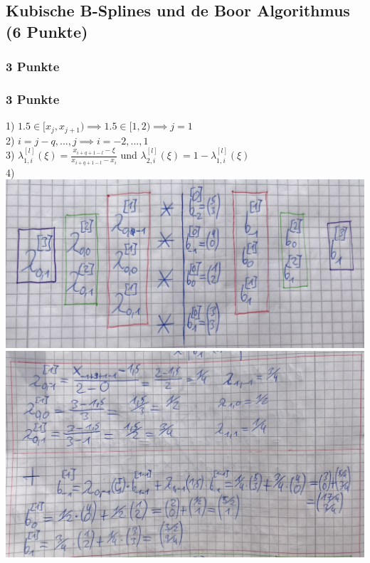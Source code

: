 \newif\ifvimbug
\vimbugfalse

\ifvimbug

\fi


\subsection{Kubische B-Splines und de Boor Algorithmus (6 Punkte)}
\subsubsection{3 Punkte}

\subsubsection{3 Punkte}

1) $1.5 \in [x_{j}, x_{j+1}) \implies 1.5 \in [1,2) \implies j=1$
\\
2) $i = j - q,...,j \implies i = -2,...,1$
\\
3) $\lambda_{1,i}^{[l]}(\xi) = \frac{x_{i+q+1-l}- \xi}{x_{i+q+1-l}-x_i}$
und $\lambda_{2,i}^{[l]}(\xi) = 1 - \lambda_{1,i}^{[l]}(\xi)$
\\
4)
\includegraphics[scale=0.5]{1b)1.PNG}
\\
\includegraphics[scale=0.5]{1b)2.PNG}
